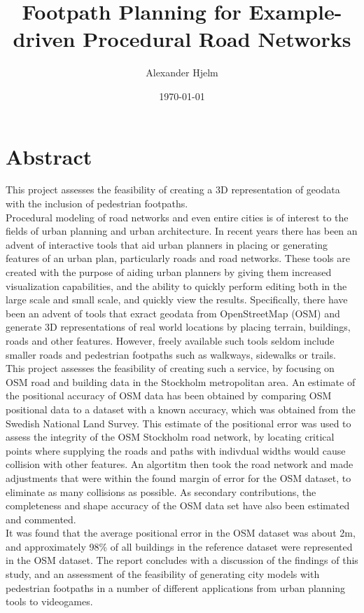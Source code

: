 \documentclass[a4paper]{article}
\title{Footpath Planning for Example-driven Procedural Road Networks}
\author{Alexander Hjelm}
\date{\today}
\begin{document}
\maketitle

\section{Abstract}

This project assesses the feasibility of creating a 3D representation of geodata with the inclusion of pedestrian footpaths.
\\
Procedural modeling of road networks and even entire cities is of interest to the fields of urban planning and urban architecture.
In recent years there has been an advent of interactive tools that aid urban planners in placing or generating features of an urban plan, particularly roads and road networks.
These tools are created with the purpose of aiding urban planners by giving them increased visualization capabilities, and the ability to quickly perform editing both in the large scale and small scale, and quickly view the results.
Specifically, there have been an advent of tools that exract geodata from OpenStreetMap (OSM) and generate 3D representations of real world locations by placing terrain, buildings, roads and other features.
However, freely available such tools seldom include smaller roads and pedestrian footpaths such as walkways, sidewalks or trails.
\\
This project assesses the feasibility of creating such a service, by focusing on OSM road and building data in the Stockholm metropolitan area.
An estimate of the positional accuracy of OSM data has been obtained by comparing OSM positional data to a dataset with a known accuracy, which was obtained from the Swedish National Land Survey.
This estimate of the positional error was used to assess the integrity of the OSM Stockholm road network, by locating critical points where supplying the roads and paths with indivdual widths would cause collision with other features.
An algortitm then took the road network and made adjustments that were within the found margin of error for the OSM dataset, to eliminate as many collisions as possible.
As secondary contributions, the completeness and shape accuracy of the OSM data set have also been estimated and commented.
\\
It was found that the average positional error in the OSM dataset was about 2m, and approximately 98\% of all buildings in the reference dataset were represented in the OSM dataset.
The report concludes with a discussion of the findings of this study, and an assessment of the feasibility of generating city models with pedestrian footpaths in a number of different applications from urban planning tools to videogames.
\end{document}
